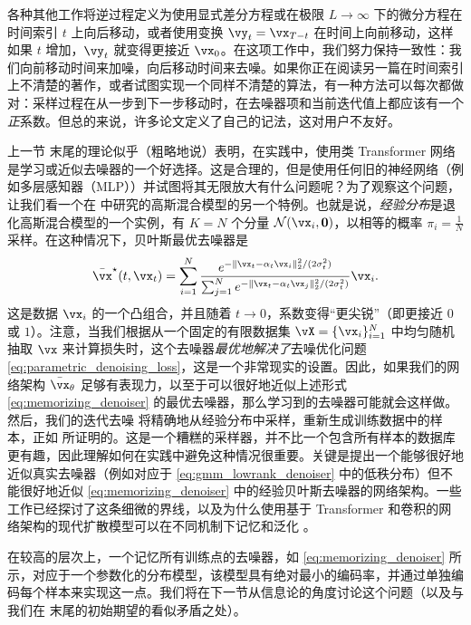 \documentclass[../../book-main.tex]{subfiles}
\begin{document}
\begin{remark}
	各种其他工作将逆过程定义为使用显式差分方程或在极限 \(L \to \infty\) 下的微分方程在时间索引 \(t\) 上向后移动，或者使用变换 \(\vy_{t} = \vx_{T - t}\) 在时间上向前移动，这样如果 \(t\) 增加，\(\vy_{t}\) 就变得更接近 \(\vx_{0}\)。在这项工作中，我们努力保持一致性：我们向前移动时间来加噪，向后移动时间来去噪。如果你正在阅读另一篇在时间索引上不清楚的著作，或者试图实现一个同样不清楚的算法，有一种方法可以每次都做对：采样过程在从一步到下一步移动时，在去噪器项和当前迭代值上都应该有一个\textit{正}系数。但总的来说，许多论文定义了自己的记法，这对用户不友好。
\end{remark}

\begin{remark}
	上一节  末尾的理论似乎（粗略地说）表明，在实践中，使用类 Transformer 网络是学习或近似去噪器的一个好选择。这是合理的，但是使用任何旧的神经网络（例如多层感知器（MLP））并试图将其无限放大有什么问题呢？为了观察这个问题，让我们看一个在  中研究的高斯混合模型的另一个特例。也就是说，\textit{经验分布}是退化高斯混合模型的一个实例，有 \(K = N\) 个分量 \(\dNorm(\vx_{i}, \vzero)\)，以相等的概率 \(\pi_{i} = \frac{1}{N}\) 采样。在这种情况下，贝叶斯最优去噪器是
	\begin{equation}\label{eq:memorizing_denoiser}
		\bar{\vx}^{\star}(t, \vx_{t}) = \sum_{i = 1}^{N}\frac{e^{-\|\vx_{t} - \alpha_{t}\vx_{i}\|_{2}^{2}/(2\sigma_{t}^{2})}}{\sum_{j = 1}^{N}e^{-\|\vx_{t} - \alpha_{t}\vx_{j}\|_{2}^{2}/(2\sigma_{t}^{2})}}\vx_{i}.
	\end{equation}
	这是数据 \(\vx_{i}\) 的一个凸组合，并且随着 \(t \to 0\)，系数变得“更尖锐”（即更接近 \(0\) 或 \(1\)）。注意，当我们根据从一个固定的有限数据集 \(\vX = \{\vx_{i}\}_{i = 1}^{N}\) 中均匀随机抽取 \(\vx\) 来计算损失时，这个去噪器\textit{最优地解决了}去噪优化问题 \eqref{eq:parametric_denoising_loss}，这是一个非常现实的设置。因此，如果我们的网络架构 \(\bar{\vx}_{\theta}\) 足够有表现力，以至于可以很好地近似上述形式 \eqref{eq:memorizing_denoiser} 的最优去噪器，那么学习到的去噪器可能就会这样做。然后，我们的迭代去噪  将精确地从经验分布中采样，重新生成训练数据中的样本，正如  所证明的。这是一个糟糕的采样器，并不比一个包含所有样本的数据库更有趣，因此理解如何在实践中避免这种情况很重要。关键是提出一个能够很好地近似真实去噪器（例如对应于 \eqref{eq:gmm_lowrank_denoiser} 中的低秩分布）但不能很好地近似 \eqref{eq:memorizing_denoiser} 中的经验贝叶斯去噪器的网络架构。一些工作已经探讨了这条细微的界线，以及为什么使用基于 Transformer 和卷积的网络架构的现代扩散模型可以在不同机制下记忆和泛化 \citep{kamb2024analytic,niedoba2024towards}。

	在较高的层次上，一个记忆所有训练点的去噪器，如 \eqref{eq:memorizing_denoiser} 所示，对应于一个参数化的分布模型，该模型具有绝对最小的编码率，并通过单独编码每个样本来实现这一点。我们将在下一节从信息论的角度讨论这个问题（以及与我们在  末尾的初始期望的看似矛盾之处）。
\end{remark}
\end{document}

